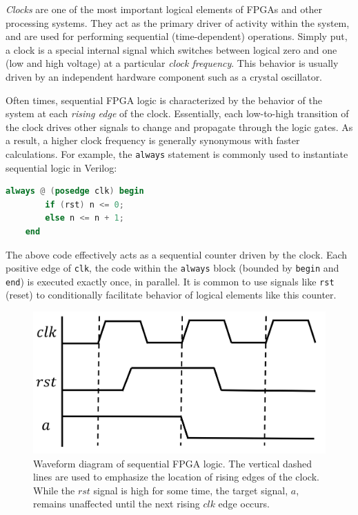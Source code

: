\documentclass[reprint,amsmath,amssymb,aps,pra]{revtex4-2}
\begin{document}
\textit{Clocks} are one of the most important logical elements of FPGAs and other processing systems. They act as the primary driver of activity within the system, and are used for performing sequential (time-dependent) operations. Simply put, a clock is a special internal signal which switches between logical zero and one (low and high voltage) at a particular \textit{clock frequency}. This behavior is usually driven by an independent hardware component such as a crystal oscillator.

Often times, sequential FPGA logic is characterized by the behavior of the system at each \textit{rising edge} of the clock. Essentially, each low-to-high transition of the clock drives other signals to change and propagate through the logic gates. As a result, a higher clock frequency is generally synonymous with faster calculations. For example, the \verb+always+ statement is commonly used to instantiate sequential logic in Verilog:
\begin{minipage}{\linewidth}
\begin{lstlisting}[language=Verilog]
    always @ (posedge clk) begin
        if (rst) n <= 0;
        else n <= n + 1;
    end
\end{lstlisting}
\end{minipage}

The above code effectively acts as a sequential counter driven by the clock. Each positive edge of \verb+clk+, the code within the \verb+always+ block (bounded by \verb+begin+ and \verb+end+) is executed exactly once, in parallel. It is common to use signals like \verb+rst+ (reset) to conditionally facilitate behavior of logical elements like this counter.

\begin{figure}
    \centering
    \includegraphics[width=\linewidth]{figs/logic_signals.png}
    \caption{Waveform diagram of sequential FPGA logic. The vertical dashed lines are used to emphasize the location of rising edges of the clock. While the $rst$ signal is high for some time, the target signal, $a$, remains unaffected until the next rising $clk$ edge occurs.}
    \label{fig:wfdiag}
\end{figure}
\end{document}
